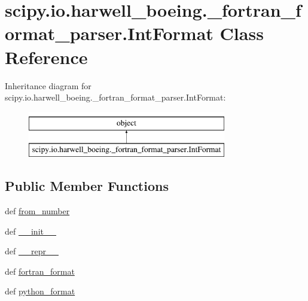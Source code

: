 \hypertarget{classscipy_1_1io_1_1harwell__boeing_1_1__fortran__format__parser_1_1IntFormat}{}\section{scipy.\+io.\+harwell\+\_\+boeing.\+\_\+fortran\+\_\+format\+\_\+parser.\+Int\+Format Class Reference}
\label{classscipy_1_1io_1_1harwell__boeing_1_1__fortran__format__parser_1_1IntFormat}
Inheritance diagram for scipy.\+io.\+harwell\+\_\+boeing.\+\_\+fortran\+\_\+format\+\_\+parser.\+Int\+Format\+:\begin{figure}[H]
\begin{center}
\leavevmode
\includegraphics[height=2.000000cm]{classscipy_1_1io_1_1harwell__boeing_1_1__fortran__format__parser_1_1IntFormat}
\end{center}
\end{figure}
\subsection*{Public Member Functions}
\begin{DoxyCompactItemize}
\item 
def \hyperlink{classscipy_1_1io_1_1harwell__boeing_1_1__fortran__format__parser_1_1IntFormat_ab53a618f17ae75dee583aaede9f088f9}{from\+\_\+number}
\item 
def \hyperlink{classscipy_1_1io_1_1harwell__boeing_1_1__fortran__format__parser_1_1IntFormat_abd0db6dc31f5b3b8556abd8e7795a6f6}{\+\_\+\+\_\+init\+\_\+\+\_\+}
\item 
def \hyperlink{classscipy_1_1io_1_1harwell__boeing_1_1__fortran__format__parser_1_1IntFormat_aef59b2bf0d6f382cd90e54f40e167fd0}{\+\_\+\+\_\+repr\+\_\+\+\_\+}
\item 
def \hyperlink{classscipy_1_1io_1_1harwell__boeing_1_1__fortran__format__parser_1_1IntFormat_ae65c64b57689205e6906d895f5258d9a}{fortran\+\_\+format}
\item 
def \hyperlink{classscipy_1_1io_1_1harwell__boeing_1_1__fortran__format__parser_1_1IntFormat_a83b20782f007e0dcc5af40cd0cef59f1}{python\+\_\+format}
\end{DoxyCompactItemize}
